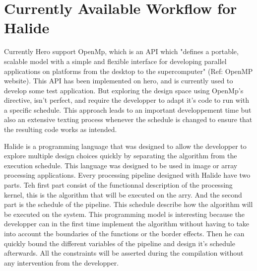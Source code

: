 \section { Currently Available Workflow for Halide}
	Currently Hero support OpenMp, which is an API which "defines a portable, scalable model with a simple and flexible interface for developing parallel applications on platforms from the desktop to the supercomputer" (Ref: OpenMP website). This API has been implemented on hero, and is currently used to develop some test application.
	But exploring the design space using OpenMp's directive, isn't perfect, and require the developper to adapt it's code to run with a specific schedule. This approach leads to an important developpement time but also an extensive texting process whenever the schedule is changed to ensure that the resulting code works as intended.

	Halide is a programming language that was designed to allow the developper to explore multiple design choices quickly by separating the algorithm from the execution schedule. This language was designed to be used in image or array processing applications.
	Every processing pipeline designed with Halide have two parts. Teh first part consist of the functionnal description of the processing kernel, this is the algorithm that will be executed on the arry. And the second part is the schedule of the pipeline. This schedule describe how the algorithm will be executed on the system. This programming model is interesting because the developper can in the first time implement the algorithm without having to take into account the boundaries of the functions or the border effects. Then he can quickly bound the different variables of the pipeline and design it's schedule afterwards. All the constraints will be asserted during the compilation without any intervention from the developper.



